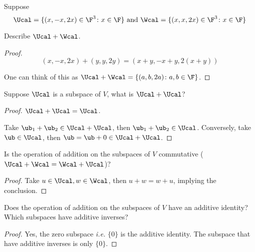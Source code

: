 \documentclass{extarticle}
\begin{document}


\begin{problem}{14}

    Suppose 
    \[\Ucal = \{(x, -x, 2x)\in \F^3 \colon x \in \F\} \text{ and } \Wcal =\{(x, x, 2x) \in \F^3 \colon x \in \F\}\]

Describe \(\Ucal + \Wcal\).
    
\end{problem}

\begin{proof}
\[(x, -x, 2x) + (y, y, 2y) = (x + y, -x + y, 2(x + y))\]

One can think of this as \(\Ucal + \Wcal = \{(a, b, 2a) \colon a,b \in \F\}\). 
\end{proof}

\begin{problem}{15}
    Suppose \(\Ucal\) is a subspace of \(V\), what is \(\Ucal + \Ucal\)?
\end{problem}

\begin{proof}
\(\Ucal + \Ucal = \Ucal\). 

Take \(\ub_1 + \ub_2 \in \Ucal + \Ucal\), then \(\ub_1 + \ub_2 \in \Ucal\). Conversely,
take \(\ub \in \Ucal\), then \(\ub = \ub + 0 \in \Ucal + \Ucal\).
\end{proof}

\begin{problem}{16}
    Is the operation of addition on the subspaces of \(V\) commutative (\(\Ucal +
    \Wcal = \Wcal + \Ucal\))? 
\end{problem}

\begin{proof}
Take \(u \in \Ucal, w \in \Wcal\), then \(u + w = w + u\), implying the conclusion. 
\end{proof}

\begin{problem}{18}
    Does the operation of addition on the subspaces of \(V\) have an additive 
    identity? Which subspaces have additive inverses?
\end{problem}

\begin{proof}
Yes, the zero subspace \emph{i.e.} \(\{0\}\) is the additive identity. The subspace
that have additive inverses is only \(\{0\}\). 
\end{proof}
\end{document}
